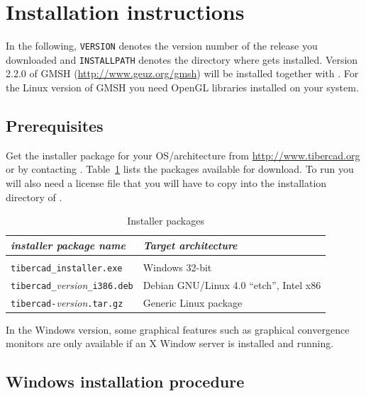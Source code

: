 \chapter*{Installation instructions}

\newcommand{\GMSHver}{2.2.0}
\newcommand{\instpath}{\texttt{INSTALLPATH}}
\newcommand{\version}{\texttt{VERSION}}

In the following, \version{} denotes the version number of the \TiberCAD{} release
you downloaded and \instpath{} denotes the directory where \TiberCAD{} gets installed.
Version \GMSHver{} of GMSH (\url{http://www.geuz.org/gmsh}) will be installed together with
\TiberCAD. For the Linux version of GMSH you need OpenGL libraries installed on your system.

\section*{Prerequisites}

Get the installer package for your OS/architecture from \url{http://www.tibercad.org}
or by contacting .
Table~\ref{install:table:packages} lists the packages available for download.
To run \TiberCAD{} you will also need a license file that you will have to copy into
the installation directory of \TiberCAD.
\begin{table}
\begin{tabular}{l|p{8cm}}
\emph{installer package name} & \emph{Target architecture} \\
\hline  \\
\verb+tibercad_installer.exe+ & Windows 32-bit \\
\verb+tibercad_+\textsl{version}\verb+_i386.deb+ & Debian GNU/Linux 4.0 ``etch'', Intel x86 \\
\verb+tibercad-+\textsl{version}\verb+.tar.gz+ & Generic Linux package
\end{tabular}
\caption{Installer packages}
\label{install:table:packages}
\end{table}

In the Windows version, some graphical features such as graphical convergence monitors are only
available if an X Window server is installed and running.




\section*{Windows installation procedure}

